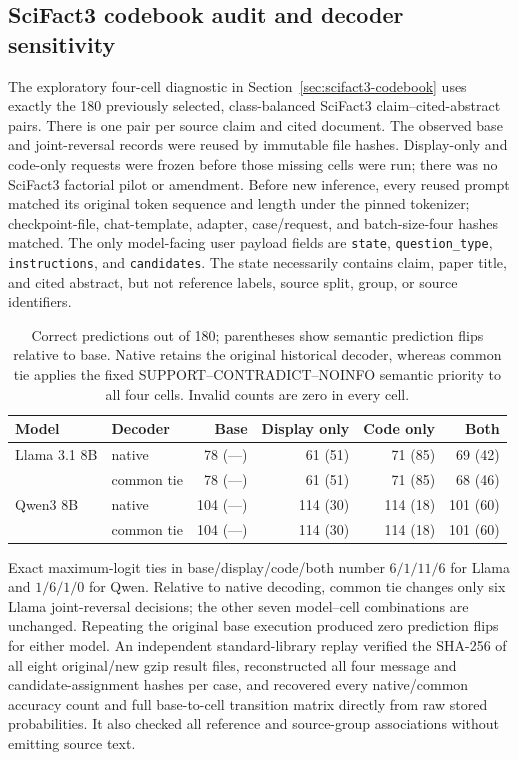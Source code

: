 \subsection{SciFact3 codebook audit and decoder sensitivity}
\label{app:scifact3-codebook}
The exploratory four-cell diagnostic in Section~\ref{sec:scifact3-codebook}
uses exactly the 180 previously selected, class-balanced SciFact3
claim--cited-abstract pairs. There is one pair per source claim and cited
document. The observed base and joint-reversal records were reused by
immutable file hashes. Display-only and code-only requests were frozen
before those missing cells were run; there was no SciFact3 factorial pilot
or amendment. Before new inference, every reused prompt matched its original
token sequence and length under the pinned tokenizer; checkpoint-file,
chat-template, adapter, case/request, and batch-size-four hashes matched.
The only model-facing user payload fields are \texttt{state},
\texttt{question\_type}, \texttt{instructions}, and \texttt{candidates}.
The state necessarily contains claim, paper title, and cited abstract, but
not reference labels, source split, group, or source identifiers.

\begin{table}[!h]
\centering
\small
\begin{tabular}{llrrrr}
\toprule
Model & Decoder & Base & Display only & Code only & Both \\
\midrule
Llama 3.1 8B & native & 78 (---) & 61 (51) & 71 (85) & 69 (42) \\
              & common tie & 78 (---) & 61 (51) & 71 (85) & 68 (46) \\
Qwen3 8B & native & 104 (---) & 114 (30) & 114 (18) & 101 (60) \\
         & common tie & 104 (---) & 114 (30) & 114 (18) & 101 (60) \\
\bottomrule
\end{tabular}
\caption{Correct predictions out of 180; parentheses show semantic
prediction flips relative to base. Native retains the original historical
decoder, whereas common tie applies the fixed SUPPORT--CONTRADICT--NOINFO
semantic priority to all four cells. Invalid counts are zero in every cell.}
\label{tab:scifact3-codebook-audit}
\end{table}

Exact maximum-logit ties in base/display/code/both number $6/1/11/6$ for
Llama and $1/6/1/0$ for Qwen. Relative to native decoding, common tie changes
only six Llama joint-reversal decisions; the other seven model--cell
combinations are unchanged. Repeating the original base execution produced
zero prediction flips for either model. An independent standard-library
replay verified the SHA-256 of all eight original/new gzip result files,
reconstructed all four message and candidate-assignment hashes per case,
and recovered every native/common accuracy count and full base-to-cell
transition matrix directly from raw stored probabilities. It also checked
all reference and source-group associations without emitting source text.

